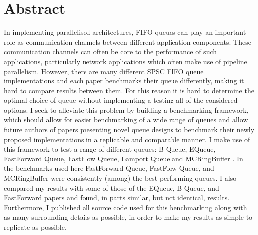 \section*{Abstract}
In implementing parallelised architectures, FIFO queues can play an important role as communication channels
between different application components\cite{WangCheng2009}.
These communication channels can often be core to the performance of such applications, particularly network
applications which often make use of pipeline parallelism\cite{Upadhyaya2007,WangCheng2009}.
However, there are many different SPSC FIFO queue implementations and each paper benchmarks their queue
differently, making it hard to compare results between them.
For this reason it is hard to determine the optimal choice of queue without implementing a testing all of the
considered options.
I seek to alleviate this problem by building a benchmarking framework, which should allow for easier
benchmarking of a wide range of queues and allow future authors of papers presenting novel queue designs to
benchmark their newly proposed implementations in a replicable and comparable manner.
I make use of this framework to test a range of different queues: B-Queue, EQueue, FastForward Queue,
FastFlow Queue, Lamport Queue and MCRingBuffer \cite{B-Queue,EQueue,FastForward,FastFlowGithub,Lamport,MCRingBuffer}.
In the benchmarks used here FastForward Queue, FastFlow Queue, and MCRingBuffer were consistently (among) the
best performing queues.
I also compared my results with some of those of the EQueue, B-Queue, and FastForward papers and found, in
parts similar, but not identical, results.
Furthermore, I published all source code used for this benchmarking along with as many surrounding details as
possible, in order to make my results as simple to replicate as possible.
